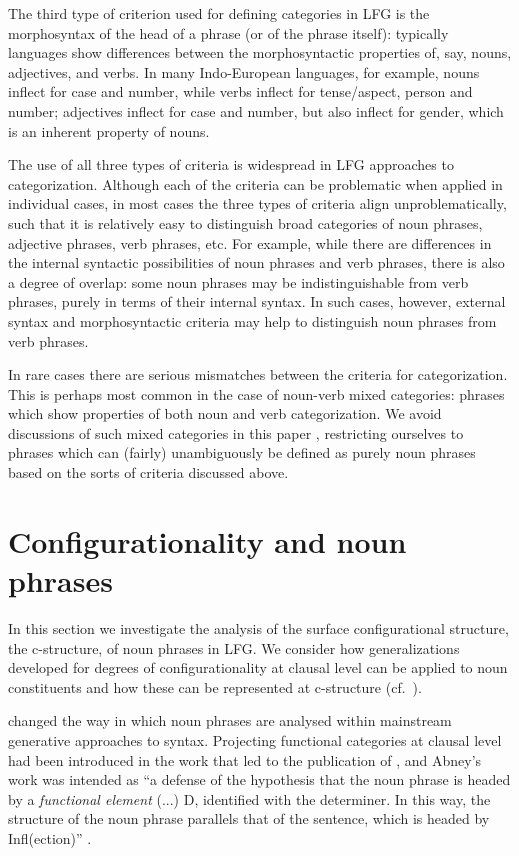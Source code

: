 \documentclass[output=paper,hidelinks]{langscibook}
\begin{document}
The third type of criterion used for defining categories in LFG is the morphosyntax of the head of a phrase (or of the phrase itself): typically languages show differences between the morphosyntactic properties of, say, nouns, adjectives, and verbs. In many Indo-European languages, for example, nouns inflect for case and number, while verbs inflect for tense/aspect, person and number; adjectives inflect for case and number, but also inflect for gender, which is an inherent property of nouns.

The use of all three types of criteria is widespread in LFG approaches to categorization. Although each of the criteria can be problematic when applied in individual cases, in most cases the three types of criteria align unproblematically, such that it is relatively easy to distinguish broad categories of noun phrases, adjective phrases, verb phrases, etc. For example, while there are differences in the internal syntactic possibilities of noun phrases and verb phrases, there is also a degree of overlap: some noun phrases may be indistinguishable from verb phrases, purely in terms of their internal syntax. In such cases, however, external syntax and morphosyntactic criteria may help to distinguish noun phrases from verb phrases. 

In rare cases there are serious mismatches between the criteria for categorization. This is perhaps most common in the case of noun-verb mixed categories: phrases which show properties of both noun and verb categorization. We avoid discussions of such mixed categories in this paper \citep[for discussion see][]{Lowe19b}, restricting ourselves to phrases which can (fairly) unambiguously be defined as purely noun phrases based on the sorts of criteria discussed above. 



\section{Configurationality and noun phrases}\label{sec:nominal:NPconfig}

In this section we investigate the analysis of the surface configurational structure, the c-structure, of noun phrases in LFG. We consider how generalizations developed for degrees of configurationality at clausal level can be applied to noun constituents and how these can be represented at c-structure (cf.\ ).

\citet{Abney87} changed the way in which noun phrases are analysed within mainstream generative approaches to syntax. Projecting functional categories at clausal level had been introduced in the work that led to the publication of \citet{Chomsky86b}, and Abney's work was intended as ``a defense of the hypothesis that the noun phrase is headed by a \emph{functional element} (...) D, identified with the determiner. In this way, the structure of the noun phrase parallels that of the sentence, which is headed by Infl(ection)'' \citep[3]{Abney87}.
\end{document}
